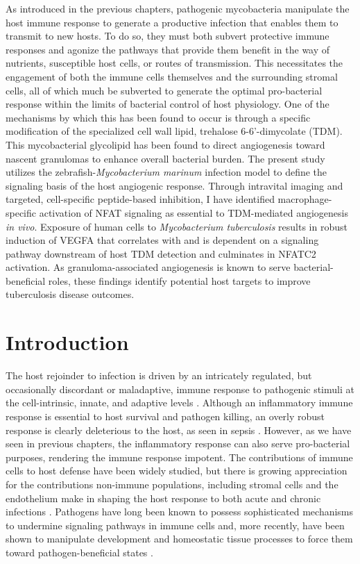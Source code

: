 As introduced in the previous chapters, pathogenic mycobacteria manipulate the host immune response to generate a productive infection that enables them to transmit to new hosts. To do so, they must both subvert protective immune responses and agonize the pathways that provide them benefit in the way of nutrients, susceptible host cells, or routes of transmission. This necessitates the engagement of both the immune cells themselves and the surrounding stromal cells, all of which much be subverted to generate the optimal pro\hyp{}bacterial response within the limits of bacterial control of host physiology. One of the mechanisms by which this has been found to occur is through a specific modification of the specialized cell wall lipid, trehalose 6\hyp{}6'\hyp{}dimycolate (TDM). This mycobacterial glycolipid has been found to direct angiogenesis toward nascent granulomas to enhance overall bacterial burden. The present study utilizes the zebrafish\hyp{}\textit{Mycobacterium marinum} infection model to define the signaling basis of the host angiogenic response. Through intravital imaging and targeted, cell\hyp{}specific peptide\hyp{}based inhibition, I have identified macrophage\hyp{}specific activation of NFAT signaling as essential to TDM\hyp{}mediated angiogenesis \textit{in vivo}. Exposure of human cells to \textit{Mycobacterium tuberculosis} results in robust induction of VEGFA that correlates with and is dependent on a signaling pathway downstream of host TDM detection and culminates in NFATC2 activation. As granuloma\hyp{}associated angiogenesis is known to serve bacterial\hyp{}beneficial roles, these findings identify potential host targets to improve tuberculosis disease outcomes.

\section{Introduction}\label{pap:intro}

The host rejoinder to infection is driven by an intricately regulated, but occasionally discordant or maladaptive, immune response to pathogenic stimuli at the cell\hyp{}intrinsic, innate, and adaptive levels \citep{Iwasaki2010, Finlay2006, Haldar2015, MacMicking2004, MacMicking2012, Kim2012, Wilburn2022}. Although an inflammatory immune response is essential to host survival and pathogen killing, an overly robust response is clearly deleterious to the host, as seen in sepsis \citep{Finethy2020, Casadevall2003}. However, as we have seen in previous chapters, the inflammatory response can also serve pro\hyp{}bacterial purposes, rendering the immune response impotent. The contributions of immune cells to host defense have been widely studied, but there is growing appreciation for the contributions non\hyp{}immune populations, including stromal cells and the endothelium \citep{Honan2021, Worrell2021, Amersfoort2022, Honan2021} make in shaping the host response to both acute and chronic infections \citep{Mueller2009, Randow2013, Krishnamurty2020}. Pathogens have long been known to possess sophisticated mechanisms to undermine signaling pathways in immune cells and, more recently, have been shown to manipulate development and homeostatic tissue processes to force them toward pathogen\hyp{}beneficial states \citep{Menzies1998, Guichard2013}.

